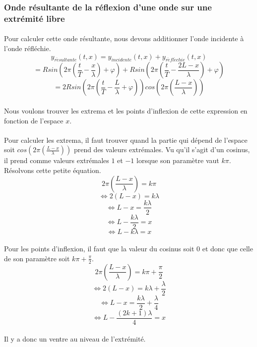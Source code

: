 \documentclass[a4paper]{article}
\begin{document}
\subsubsection{Onde résultante de la réflexion d'une onde sur une extrémité libre}
\paragraph{}Pour calculer cette onde résultante, nous devons additionner l'onde incidente à l'onde réfléchie.
\[y_{r\acute{e}sultante}(t,x)=y_{incidente}(t,x)+y_{r\acute{e}fl\acute{e}chie}(t,x)\]
\[=Rsin\left(2\pi \left(\frac{t}{T}-\frac{x}{\lambda}\right)+\varphi\right)+Rsin\left(2\pi \left(\frac{t}{T}-\frac{2L-x}{\lambda}\right)+\varphi\right)\]
\[=2Rsin\left(2\pi \left(\frac{t}{T}-\frac{L}{\lambda}+\varphi\right)\right)cos\left(2\pi \left(\frac{L-x}{\lambda}\right)\right)\]
\paragraph{}Nous voulons trouver les extrema et les points d'inflexion de cette expression en fonction de l'espace $x$.
\paragraph{}Pour calculer les extrema, il faut trouver quand la partie qui dépend de l'espace soit $cos\left(2\pi \left(\frac{L-x}{\lambda}\right)\right)$ prend des valeurs extrémales. Vu qu'il s'agit d'un cosinus, il prend comme valeurs extrémales $1$ et $-1$ lorsque son paramètre vaut $k\pi$. Résolvons cette petite équation.
\[2\pi\left(\frac{L-x}{\lambda}\right)=k\pi\]
\[\Leftrightarrow 2\left(L-x\right)=k\lambda\]
\[\Leftrightarrow L-x=\frac{k\lambda}{2}\]
\[\Leftrightarrow L-\frac{k\lambda}{2}=x\]
\[\Leftrightarrow L-k\lambda=x\]
\paragraph{}Pour les points d'inflexion, il faut que la valeur du cosinus soit $0$ et donc que celle de son paramètre soit $k\pi+\frac{\pi}{2}$.
\[2\pi\left(\frac{L-x}{\lambda}\right)=k\pi+\frac{\pi}{2}\]
\[\Leftrightarrow 2\left(L-x\right)=k\lambda+\frac{\lambda}{2}\]
\[\Leftrightarrow L-x=\frac{k\lambda}{2}+\frac{\lambda}{4}\]
\[\Leftrightarrow L-\frac{(2k+1)\lambda}{4}=x\]
\paragraph{}Il y a donc un ventre au niveau de l'extrémité.
\end{document}
